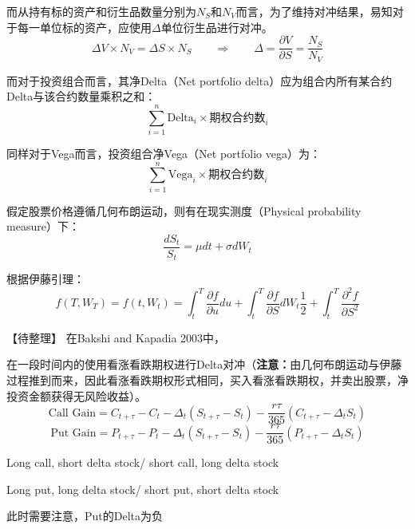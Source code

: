 \documentclass[11pt]{article}
\begin{document}
而从持有标的资产和衍生品数量分别为$N_S$和$N_V$而言，为了维持对冲结果，易知对于每一单位标的资产，应使用$\Delta$单位衍生品进行对冲。
\begin{equation*}
    \Delta V \times N_V = \Delta S \times N_S \qquad \Rightarrow \qquad
    \Delta = \frac{\partial V}{\partial S} = \frac{N_S}{N_V}
\end{equation*}

而对于投资组合而言，其净Delta（Net portfolio delta）应为组合内所有某合约Delta与该合约数量乘积之和：
\begin{equation*}
    \sum_{i=1}^{n} \text{Delta}_i \times \text{期权合约数}_i
\end{equation*}

同样对于Vega而言，投资组合净Vega（Net portfolio vega）为：
\begin{equation*}
    \sum_{i=1}^{n} \text{Vega}_i \times \text{期权合约数}_i
\end{equation*}

假定股票价格遵循几何布朗运动，则有在现实测度（Physical probability measure）下：
\begin{equation*}
    \frac{dS_t}{S_t} = \mu dt + \sigma dW_t
\end{equation*}

根据伊藤引理：
\begin{equation*}
    f(T,W_T) =f(t,W_t) = \int^T_t \frac{\partial f}{\partial u}du + \int^T_t \frac{\partial f}{\partial S} dW_t \frac{1}{2} + \int^T_t\frac{\partial ^2 f}{\partial S^2} 
\end{equation*}

【待整理】 在Bakshi and Kapadia 2003中，

在一段时间内的使用看涨看跌期权进行Delta对冲（\textbf{注意：}由几何布朗运动与伊藤过程推到而来，因此看涨看跌期权形式相同，买入看涨看跌期权，并卖出股票，净投资金额获得无风险收益）。
\begin{equation*}
    \text{Call Gain} = C_{t+\tau} - C_t - \Delta_t ( S_{t+\tau}-S_t) - \frac{r\tau}{365}(C_{t+\tau} - \Delta_t S_t)
\end{equation*}
\begin{equation*}
    \text{Put Gain} = P_{t+\tau} - P_t - \Delta_t ( S_{t+\tau}-S_t) - \frac{r\tau}{365}(P_{t+\tau} - \Delta_t S_t)
\end{equation*}

Long call, short delta stock/ short call, long delta stock

Long put, long delta stock/ short put, short delta stock

此时需要注意，Put的Delta为负
\end{document}
